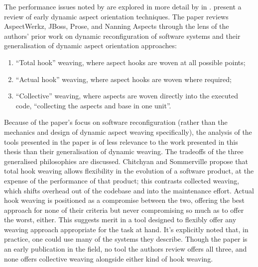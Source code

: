 
The performance issues noted by \citeauthor{popovici2003JITaspects} are explored
in more detail by \citeauthor{dynamicAOchitchyan} in \cite{dynamicAOchitchyan}.
\citeauthor{dynamicAOchitchyan} present a review of early dynamic aspect orientation
techniques. The paper reviews AspectWerkz, JBoss, Prose, and Nanning Aspects
through the lens of the authors' prior work on dynamic reconfiguration of
software systems and their generalisation of dynamic aspect orientation
approaches: 

\begin{enumerate}
\item ``Total hook'' weaving, where aspect hooks are woven at all possible
points; 
\item ``Actual hook'' weaving, where aspect hooks are woven where required;
\item ``Collective'' weaving, where aspects are woven directly into the executed
code, ``collecting the aspects and base in one unit''. 
\end{enumerate}

Because of the paper's focus on software reconfiguration (rather than the
mechanics and design of dynamic aspect weaving specifically), the analysis of
the tools presented in the paper is of less relevance to the work presented in
this thesis than their generalisation of dynamic weaving. The tradeoffs of the
three generalised philosophies are discussed. Chitchyan and Sommerville propose
that total hook weaving allows flexibility in the evolution of a software
product, at the expense of the performance of that product; this contrasts
collected weaving, which shifts overhead out of the codebase and into the
maintenance effort. Actual hook weaving is positioned as a compromise between
the two, offering the best approach for none of their criteria but never
compromising so much as to offer the worst, either. This suggests merit in a
tool designed to flexibly offer any weaving approach appropriate for the task at
hand. It's explicitly noted that, in practice, one could use many of the systems
they describe. Though the paper is an early publication in the field, no tool
the authors review offers all three, and none offers collective weaving
alongside either kind of hook weaving.


